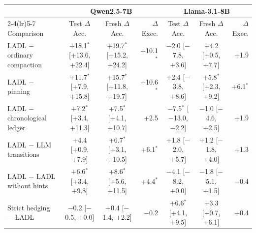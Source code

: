 \begin{tabular}{lccrccr}
\toprule
 & \multicolumn{3}{c}{Qwen2.5-7B} & \multicolumn{3}{c}{Llama-3.1-8B} \\
\cmidrule(lr){2-4}\cmidrule(lr){5-7}
Comparison & Test $\Delta$Acc. & Fresh $\Delta$Acc. & $\Delta$Exec. & Test $\Delta$Acc. & Fresh $\Delta$Acc. & $\Delta$Exec. \\
\midrule
LADL $-$ ordinary compaction & +18.1$^{*}$ [+13.6, +22.4] & +19.7$^{*}$ [+15.2, +24.2] & +10.1$^{*}$ & $-$2.0 [$-$7.8, +3.6] & +4.2 [+0.5, +7.7] & +1.9 \\
LADL $-$ pinning & +11.7$^{*}$ [+7.9, +15.8] & +15.7$^{*}$ [+11.8, +19.7] & +10.6$^{*}$ & +2.4 [$-$3.8, +8.6] & +5.8$^{*}$ [+2.3, +9.2] & +6.1$^{*}$ \\
LADL $-$ chronological ledger & +7.2$^{*}$ [+3.4, +11.3] & +7.5$^{*}$ [+4.1, +10.7] & +2.5 & $-$7.5$^{*}$ [$-$13.0, $-$2.2] & $-$1.0 [$-$4.6, +2.5] & +1.9 \\
LADL $-$ LLM transitions & +4.4 [+0.9, +7.9] & +6.7$^{*}$ [+3.1, +10.5] & +6.1$^{*}$ & +1.8 [$-$2.0, +5.7] & +1.2 [$-$1.8, +4.0] & +1.3 \\
LADL $-$ LADL without hints & +6.6$^{*}$ [+3.4, +9.8] & +8.6$^{*}$ [+5.6, +11.5] & +4.4$^{*}$ & $-$4.1 [$-$8.2, +0.0] & $-$1.8 [$-$5.1, +1.5] & $-$0.4 \\
Strict hedging $-$ LADL & $-$0.2 [$-$0.5, +0.0] & +0.4 [$-$1.4, +2.2] & $-$0.2 & +6.6$^{*}$ [+4.1, +9.5] & +3.3 [+0.7, +6.1] & +0.4 \\
\bottomrule
\end{tabular}
